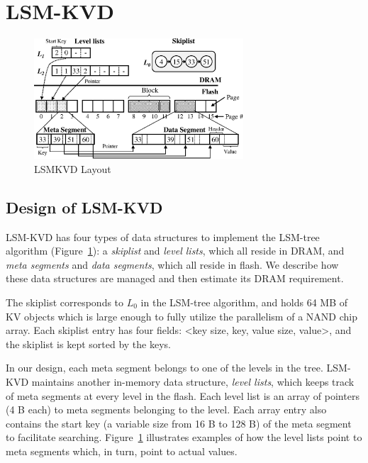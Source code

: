 \documentclass{abstract_hutech}
\newcommand{\ours}{LSM-KVD}
\begin{document}
\section{\ours{}}
\begin{figure}[h]
	\centering
	\includegraphics[height=4.5cm]{fig/fig3.eps}
	\caption{LSMKVD Layout}
	\label{fig:overall}\vspace{-11pt}
\end{figure}

\subsection{Design of \ours{}}
\ours{} has four types of data structures to implement the LSM-tree algorithm
(Figure~\ref{fig:overall}): a \textit{skiplist} and \textit{level lists}, which
all reside in DRAM, and  \textit{meta segments} and \textit{data segments},
which all reside in flash.  We describe how these data structures are
managed and then estimate its DRAM requirement. 

The skiplist corresponds to $L_0$ in the LSM-tree algorithm, and holds 64 MB of KV
objects which is large enough to fully utilize the parallelism of a NAND chip
array.  Each skiplist entry has four fields: <key size, key, value size,
value>, and the skiplist is kept sorted by the keys. 

In our design, each meta segment belongs to one of the levels in the tree.
\ours{} maintains another in-memory data structure, \textit{level lists}, which
keeps track of meta segments at every level in the flash.  Each level list is
an array of pointers (4 B each) to meta segments belonging to the level.  Each array
entry also contains the start key (a variable size from 16 B to 128 B) of the meta segment to facilitate searching.
Figure~\ref{fig:overall} illustrates examples of how the level lists point to
meta segments which, in turn, point to actual values.
\end{document}

